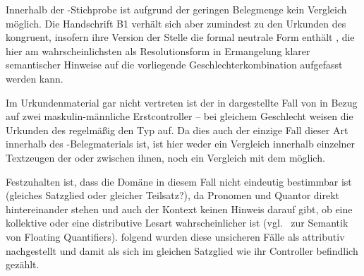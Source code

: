 Innerhalb der \KC{}-Stichprobe ist aufgrund der geringen Belegmenge
kein Vergleich möglich. Die Handschrift B1 verhält sich aber
zumindest zu den Urkunden des \CAO{} kongruent, insofern ihre Version
der Stelle die formal neutrale Form  enthält
, die hier am wahrscheinlichsten als Resolutionsform in
Ermangelung klarer semantischer Hinweise auf die vorliegende
Geschlechterkombination aufgefasst werden kann.

Im Urkundenmaterial gar nicht vertreten ist der in 
dargestellte Fall von  in Bezug auf zwei maskulin-männliche
Erstcontroller -- bei gleichem Geschlecht weisen die Urkunden des
\CAO{} regelmäßig den Typ  auf. Da dies auch der einzige
Fall dieser Art innerhalb des \KC{}-Belegmaterials ist, ist hier weder
ein Vergleich innerhalb einzelner Textzeugen der \KC{} oder zwischen
ihnen, noch ein Vergleich mit dem \CAO{} möglich.

\begin{exe}
\end{exe}

Festzuhalten ist, dass die Domäne in diesem Fall nicht eindeutig bestimmbar ist
(gleiches Satzglied oder gleicher Teilsatz?), da Pronomen und Quantor direkt
hintereinander stehen und auch der Kontext keinen Hinweis darauf gibt, ob eine
kollektive oder eine distributive Lesart wahrscheinlicher ist
(vgl.~ zur Semantik von Floating Quantifiers).
\citet[623]{ksw2} folgend wurden diese unsicheren Fälle als attributiv
nachgestellt und damit als sich im gleichen Satzglied wie ihr Controller
befindlich gezählt.

